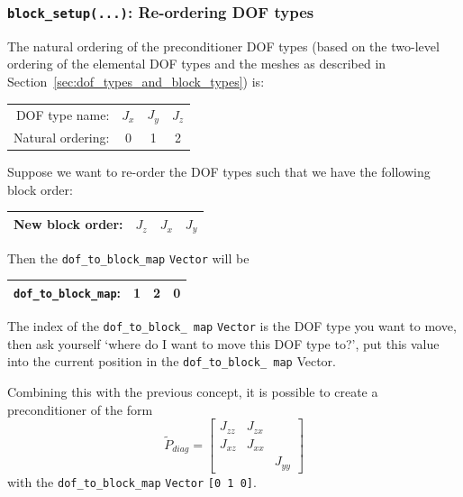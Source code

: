 \subsubsection{\texttt{block\_setup(...)}: Re-ordering DOF
  types\label{sec:block_setup_reordering_dof_types}} The natural ordering of
the preconditioner DOF types (based on the two-level ordering of the elemental
DOF types and the meshes as described in
Section~\ref{sec:dof_types_and_block_types}) is:
\begin{center}
    \begin{tabular}{ | r | c c c |}
    \hline
    DOF type name: & $J_{x}$ & $J_{y}$ & $J_{z}$ \\ 
    Natural ordering: & 0 & 1 & 2 \\ 
    \hline
    \end{tabular}
\end{center}
Suppose we want to re-order the DOF types such that we have the following block
order:
\begin{center}
    \begin{tabular}{ | r | c c c |}
    \hline
    New block order: & $J_{z}$ & $J_{x}$ & $J_{y}$ \\ 
    \hline
    \end{tabular}
\end{center}
Then the \texttt{dof\_\allowbreak to\_\allowbreak block\_\allowbreak map}
\texttt{Vector} will be
\begin{center}
    \begin{tabular}{ | r | c c c |}
    \hline
    \verb+dof_to_block_map+: & 1 & 2 & 0 \\ 
    \hline
    \end{tabular}
\end{center}
The index of the \texttt{dof\_\allowbreak to\_\allowbreak block\_\allowbreak
  map} \texttt{Vector} is the DOF type you want to move, then ask yourself
`where do I want to move this DOF type to?', put this value into the current
position in the \texttt{dof\_\allowbreak to\_\allowbreak block\_\allowbreak
  map} Vector.

Combining this with the previous concept, it is possible to create a preconditioner of the form
\begin{equation*}
\tilde{P}_{diag} =
\begin{bmatrix}
J_{zz}&J_{zx}&       \\
J_{xz}&J_{xx}&       \\
      &      &J_{yy}
\end{bmatrix}
\end{equation*}
with the \texttt{dof\_\allowbreak to\_\allowbreak block\_\allowbreak map}
\texttt{Vector} \texttt{[0 1 0]}.

